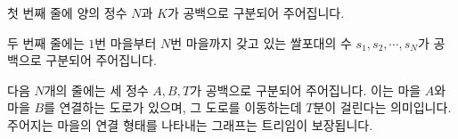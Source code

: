 첫 번째 줄에 양의 정수 $N$과 $K$가 공백으로 구분되어 주어집니다.

두 번째 줄에는 $1$번 마을부터 $N$번 마을까지 갖고 있는 쌀포대의 수 $s_{1}, s_{2}, \cdots, s_{N}$가 공백으로 구분되어 주어집니다.

다음 $N$개의 줄에는 세 정수 $A, B, T$가 공백으로 구분되어 주어집니다. 이는 마을 $A$와 마을 $B$를 연결하는 도로가 있으며, 그 도로를 이동하는데 $T$분이 걸린다는 의미입니다.
주어지는 마을의 연결 형태를 나타내는 그래프는 트리임이 보장됩니다.